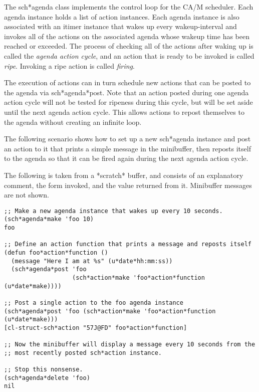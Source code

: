 
The sch*agenda class implements the control loop for the CA/M scheduler.
Each agenda instance holds a list of action instances.  Each agenda
instance is also associated with an itimer instance that wakes up 
every wakeup-interval and invokes all of the actions on the 
associated agenda whose wakeup time has been reached or exceeded. 
The process of checking all of the actions after waking up is called the 
{\em agenda action cycle}, and an action that is ready to be
invoked is called {\em ripe}.  Invoking a ripe action is called 
{\em firing}.

The execution of actions can in turn schedule new actions that can be
posted to the agenda via sch*agenda*post.  Note that an 
action posted during one agenda action cycle will
not be tested for ripeness during this cycle, but will be set aside
until the next agenda action cycle.  This allows actions to repost
themselves to the agenda without creating an infinite loop.

The following scenario shows how to set up a new sch*agenda instance 
and post an action to it that prints a simple message in the minibuffer,
then reposts itself to the agenda so that it can be fired again during
the next agenda action cycle.

The following is taken from a *scratch* buffer, and consists of an
explanatory comment, the form invoked, and the value returned from it.
Minibuffer messages are not shown.

\small\begin{verbatim}
;; Make a new agenda instance that wakes up every 10 seconds. 
(sch*agenda*make 'foo 10)
foo

;; Define an action function that prints a message and reposts itself
(defun foo*action*function ()
  (message "Here I am at %s" (u*date*hh:mm:ss))
  (sch*agenda*post 'foo
                   (sch*action*make 'foo*action*function (u*date*make))))

;; Post a single action to the foo agenda instance
(sch*agenda*post 'foo (sch*action*make 'foo*action*function (u*date*make)))
[cl-struct-sch*action "57J@FD" foo*action*function]

;; Now the minibuffer will display a message every 10 seconds from the 
;; most recently posted sch*action instance.

;; Stop this nonsense.
(sch*agenda*delete 'foo)
nil
\end{verbatim}\normalsize

